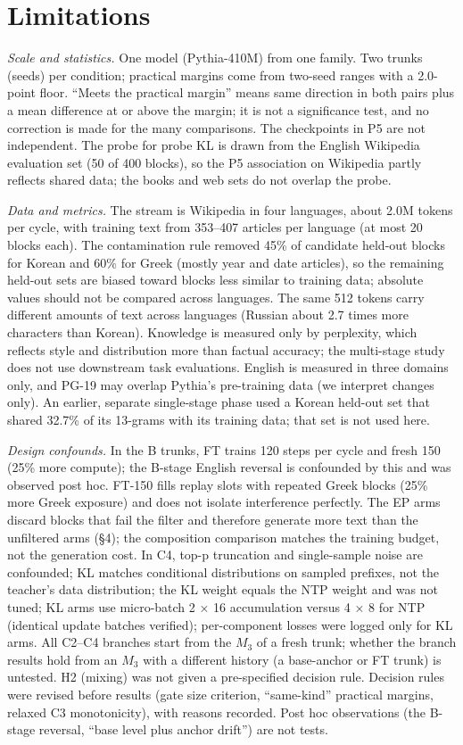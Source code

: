 \documentclass[11pt]{article}
\begin{document}
\section{Limitations}

\emph{Scale and statistics.} One model (Pythia-410M) from one family. Two trunks (seeds) per condition; practical margins come from two-seed ranges with a 2.0-point floor. ``Meets the practical margin'' means same direction in both pairs plus a mean difference at or above the margin; it is not a significance test, and no correction is made for the many comparisons. The checkpoints in P5 are not independent. The probe for probe KL is drawn from the English Wikipedia evaluation set (50 of 400 blocks), so the P5 association on Wikipedia partly reflects shared data; the books and web sets do not overlap the probe.

\emph{Data and metrics.} The stream is Wikipedia in four languages, about 2.0M tokens per cycle, with training text from 353–407 articles per language (at most 20 blocks each). The contamination rule removed 45\% of candidate held-out blocks for Korean and 60\% for Greek (mostly year and date articles), so the remaining held-out sets are biased toward blocks less similar to training data; absolute values should not be compared across languages. The same 512 tokens carry different amounts of text across languages (Russian about 2.7 times more characters than Korean). Knowledge is measured only by perplexity, which reflects style and distribution more than factual accuracy; the multi-stage study does not use downstream task evaluations. English is measured in three domains only, and PG-19 may overlap Pythia's pre-training data (we interpret changes only). An earlier, separate single-stage phase used a Korean held-out set that shared 32.7\% of its 13-grams with its training data; that set is not used here.

\emph{Design confounds.} In the B trunks, FT trains 120 steps per cycle and fresh 150 (25\% more compute); the B-stage English reversal is confounded by this and was observed post hoc. FT-150 fills replay slots with repeated Greek blocks (25\% more Greek exposure) and does not isolate interference perfectly. The EP arms discard blocks that fail the filter and therefore generate more text than the unfiltered arms (§4); the composition comparison matches the training budget, not the generation cost. In C4, top-p truncation and single-sample noise are confounded; KL matches conditional distributions on sampled prefixes, not the teacher's data distribution; the KL weight equals the NTP weight and was not tuned; KL arms use micro-batch 2 × 16 accumulation versus 4 × 8 for NTP (identical update batches verified); per-component losses were logged only for KL arms. All C2–C4 branches start from the $M_3$ of a fresh trunk; whether the branch results hold from an $M_3$ with a different history (a base-anchor or FT trunk) is untested. H2 (mixing) was not given a pre-specified decision rule. Decision rules were revised before results (gate size criterion, ``same-kind'' practical margins, relaxed C3 monotonicity), with reasons recorded. Post hoc observations (the B-stage reversal, ``base level plus anchor drift'') are not tests.
\end{document}
